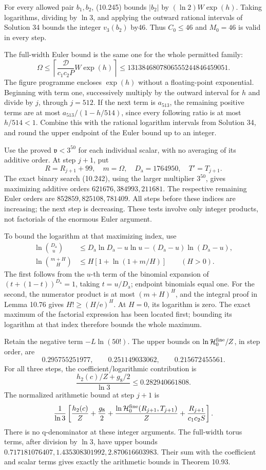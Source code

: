 \documentclass[
  11pt,
  a4paper,
]{article}
\begin{document}
For every allowed pair \(b_1,b_2\), (10.245) bounds \(|b_2|\) by
\((\ln2)W\exp(h)\). Taking logarithms, dividing by \(\ln3\), and
applying the outward rational intervals of Solution 34 bounds the
integer \(v_3(b_2)\) by46. Thus \(C_0\le46\) and \(M_0=46\) is valid in
every step.

The full-width Euler bound is the same one for the whole permitted
family: \[
\Omega\le
\left\lceil\frac{\mathcal D}{c_1c_2P}W\exp(h)\right\rceil
\le1313846807806555244846459051.
\] The figure programme encloses \(\exp(h)\) without a floating-point
exponential. Beginning with term one, successively multiply by the
outward interval for \(h\) and divide by \(j\), through \(j=512\). If
the next term is \(a_{513}\), the remaining positive terms are at most
\(a_{513}/(1-h/514)\), since every following ratio is at most
\(h/514<1\). Combine this with the rational logarithm intervals from
Solution 34, and round the upper endpoint of the Euler bound up to an
integer.

Use the proved \(\mathfrak v<3^{50}\) for each individual scalar, with
no averaging of its additive order. At step \(j+1\), put \[
R=R_{j+1}+99,\quad m=\Omega,\quad
D_{\mathrm a}=1764950,\quad T'=T_{j+1}.
\] The exact binary search (10.242), using the larger multiplier
\(3^{50}\), gives maximizing additive orders \(621676,384993,211681\).
The respective remaining Euler orders are \(852859,825108,781409\). All
steps before these indices are increasing; the next step is decreasing.
These tests involve only integer products, not factorials of the
enormous Euler argument.

To bound the logarithm at that maximizing index, use \[
\begin{aligned}
\ln\binom{D_{\mathrm a}}u
&\le D_{\mathrm a}\ln D_{\mathrm a}
-u\ln u-(D_{\mathrm a}-u)\ln(D_{\mathrm a}-u),\\
\ln\binom{m+H}H
&\le H\left[1+\ln(1+m/H)\right]\qquad(H>0).
\end{aligned}
\] The first follows from the \(u\)-th term of the binomial expansion of
\((t+(1-t))^{D_{\mathrm a}}=1\), taking \(t=u/D_{\mathrm a}\); endpoint
binomials equal one. For the second, the numerator product is at most
\((m+H)^H\), and the integral proof in Lemma 10.76 gives
\(H!\ge(H/\mathrm e)^H\). At \(H=0\), its logarithm is zero. The exact
maximum of the factorial expression has been located first; bounding its
logarithm at that index therefore bounds the whole maximum.

Retain the negative term \(-L\ln(50!)\). The upper bounds on
\(\ln\mathcal H_0^{\rm fine}/Z\), in step order, are \[
0.295755251977,\qquad0.251149033062,\qquad0.215672455561.
\] For all three steps, the coefficient/logarithmic contribution is \[
\frac{h_2(c)/Z+g_8/2}{\ln3}
\le0.282940661808.
\] The normalized arithmetic bound at step \(j+1\) is \[
\frac1{\ln3}\left[
\frac{h_2(c)}Z+\frac{g_8}{2}
+\frac{\ln\mathcal H_0^{\rm fine}(R_{j+1},T_{j+1})}Z
+\frac{R_{j+1}}{c_1c_2S}\right].
\] There is no q-denominator at these integer arguments. The full-width
torus terms, after division by \(\ln3\), have upper bounds
\(0.717181076407,1.435308301992,2.870616603983\). Their sum with the
coefficient and scalar terms gives exactly the arithmetic bounds in
Theorem 10.93.
\end{document}
